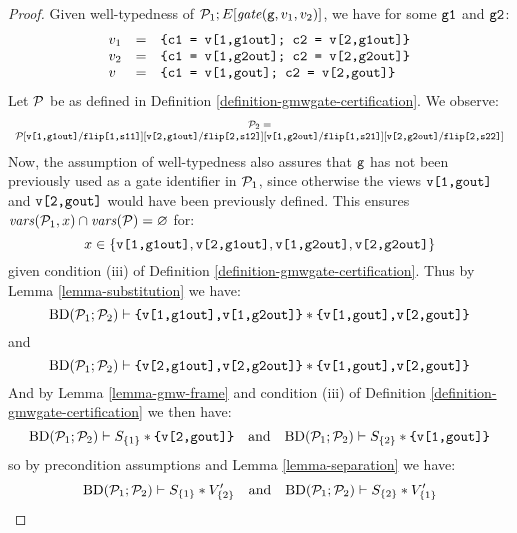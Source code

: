 \begin{proof}
  Given well-typedness of $\mathcal{P}_1;E[\mathit{gate}(\texttt{g},v_1,v_2)]$, we have for some $\texttt{g1}$ and $\texttt{g2}$:
  $$
  \begin{array}{lcl}
   v_1 &=& \texttt{\{c1 = v[1,g1out]; c2 = v[2,g1out]\}}\\
   v_2 &=& \texttt{\{c1 = v[1,g2out]; c2 = v[2,g2out]\}}\\
    v &=& \texttt{\{c1 = v[1,gout]; c2 = v[2,gout]\}}
  \end{array}
  $$
  Let $\mathcal{P}$ be as defined in Definition \ref{definition-gmwgate-certification}.
  We observe:
  $$
  {\footnotesize
    \begin{array}{c}
      \mathcal{P}_2 = \\
      \mathcal{P}[\texttt{v[1,g1out]}/\texttt{flip[1,s11]}][\texttt{v[2,g1out]}/\texttt{flip[2,s12]}][\texttt{v[1,g2out]}/\texttt{flip[1,s21]}][\texttt{v[2,g2out]}/\texttt{flip[2,s22]}]
    \end{array}
  }
  $$
  Now, the assumption of well-typedness also assures that $\texttt{g}$
  has not been previously used as a gate identifier in $\mathcal{P}_1$,
  since otherwise the views $\texttt{v[1,gout]}$ and $\texttt{v[2,gout]}$
  would have been previously defined. This ensures $\mathit{vars}(\mathcal{P}_1,x)
  \cap \mathit{vars}(\mathcal{P}) = \varnothing$ for:
  $$x \in \{ \texttt{v[1,g1out]}, \texttt{v[2,g1out]}, \texttt{v[1,g2out]}, \texttt{v[2,g2out]}\}$$
  given condition (iii) of Definition \ref{definition-gmwgate-certification}.
  Thus by Lemma \ref{lemma-substitution} we have:
  $$\mathrm{BD}(\mathcal{P}_1;\mathcal{P}_2) \vdash \texttt{\{v[1,g1out],v[1,g2out]\}} * \texttt{\{v[1,gout],v[2,gout]\}}$$
  and
  $$\mathrm{BD}(\mathcal{P}_1;\mathcal{P}_2) \vdash \texttt{\{v[2,g1out],v[2,g2out]\}} * \texttt{\{v[1,gout],v[2,gout]\}}$$
  And by Lemma \ref{lemma-gmw-frame} and condition (iii) of Definition
  \ref{definition-gmwgate-certification} we then have:
  $$\mathrm{BD}(\mathcal{P}_1;\mathcal{P}_2) \vdash S_{\{1\}} * \texttt{\{v[2,gout]\}} \quad \text{and} \quad
  \mathrm{BD}(\mathcal{P}_1;\mathcal{P}_2) \vdash S_{\{2\}} * \texttt{\{v[1,gout]\}}$$
  so by precondition assumptions and Lemma \ref{lemma-separation} we have:
  $$\mathrm{BD}(\mathcal{P}_1;\mathcal{P}_2) \vdash S_{\{1\}} * V'_{\{2\}} \quad \text{and} \quad
  \mathrm{BD}(\mathcal{P}_1;\mathcal{P}_2) \vdash S_{\{2\}} * V'_{\{1\}}$$
\end{proof}

